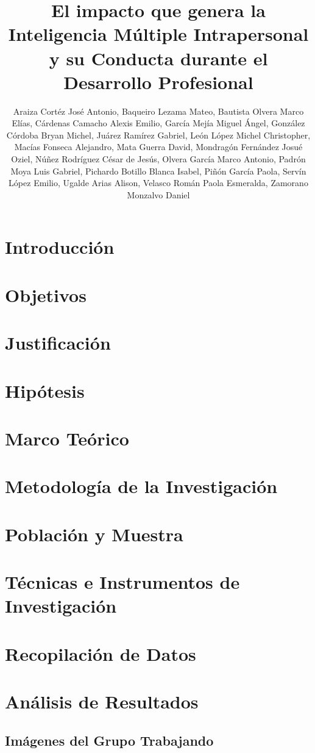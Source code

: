 \documentclass[stu,12pt]{apa7}
\affiliation{Facultad de Inform\'atica, Universidad Aut\'onoma de Quer\'etaro}
\title{El impacto que genera la Inteligencia M\'ultiple Intrapersonal y su
Conducta durante el Desarrollo Profesional}
\author{Araiza Cort\'ez Jos\'e Antonio, Baqueiro Lezama Mateo, Bautista Olvera
Marco El\'ias, C\'ardenas Camacho Alexis Emilio, Garc\'ia Mej\'ia Miguel
\'Angel, Gonz\'alez C\'ordoba Bryan Michel, Ju\'arez Ram\'irez Gabriel, Le\'on
L\'opez Michel Christopher, Mac\'ias Fonseca Alejandro, Mata Guerra David, 
Mondrag\'on Fern\'andez Josu\'e Oziel, N\'u\~nez Rodr\'iguez C\'esar de Jes\'us,
Olvera Garc\'ia Marco Antonio, Padr\'on Moya Luis Gabriel, Pichardo Botillo
Blanca Isabel, Pi\~n\'on Garc\'ia Paola, Serv\'in L\'opez Emilio, Ugalde Arias
Alison, Velasco Rom\'an Paola Esmeralda, Zamorano Monzalvo Daniel}
\begin{document}
\maketitle
\tableofcontents
\listoffigures
\listoftables
\section{Introducci\'on}


\section{Objetivos}

\section{Justificaci\'on}

\section{Hip\'otesis}

\section{Marco Te\'orico}

\section{Metodolog\'ia de la Investigaci\'on}

\section{Poblaci\'on y Muestra}

\section{T\'ecnicas e Instrumentos de Investigaci\'on}

\section{Recopilaci\'on de Datos}

\section{An\'alisis de Resultados}


\begin{appendix}
\section{Im\'agenes del Grupo Trabajando}

\end{appendix}
\printbibliography
\end{document}
